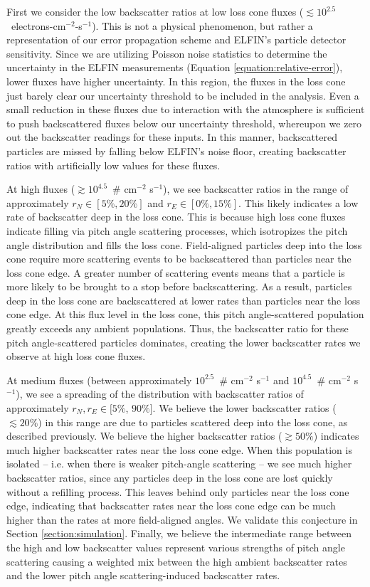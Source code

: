 \documentclass[draft]{agujournal2019}
\begin{document}
First we consider the low backscatter ratios at low loss cone fluxes ($\lesssim 10^{2.5}$~electrons-cm$^{-2}$-s$^{-1}$). This is not a physical phenomenon, but rather a representation of our error propagation scheme and ELFIN's particle detector sensitivity. Since we are utilizing Poisson noise statistics to determine the uncertainty in the ELFIN measurements (Equation \ref{equation:relative-error}), lower fluxes have higher uncertainty. In this region, the fluxes in the loss cone just barely clear our uncertainty threshold to be included in the analysis. Even a small reduction in these fluxes due to interaction with the atmosphere is sufficient to push backscattered fluxes below our uncertainty threshold, whereupon we zero out the backscatter readings for these inputs. In this manner, backscattered particles are missed by falling below ELFIN's noise floor, creating backscatter ratios with artificially low values for these fluxes.

At high fluxes ($\gtrsim 10^{4.5}$~\# cm$^{-2}$ s$^{-1}$), we see backscatter ratios in the range of approximately $r_N \in [5\%, 20\%]$ and $r_E \in [0\%, 15\%]$. This likely indicates a low rate of backscatter deep in the loss cone. This is because high loss cone fluxes indicate filling via pitch angle scattering processes, which isotropizes the pitch angle distribution and fills the loss cone. Field-aligned particles deep into the loss cone require more scattering events to be backscattered than particles near the loss cone edge. A greater number of scattering events means that a particle is more likely to be brought to a stop before backscattering. As a result, particles deep in the loss cone are backscattered at lower rates than particles near the loss cone edge. At this flux level in the loss cone, this pitch angle-scattered population greatly exceeds any ambient populations. Thus, the backscatter ratio for these pitch angle-scattered particles dominates, creating the lower backscatter rates we observe at high loss cone fluxes.

At medium fluxes (between approximately $10^{2.5}$~\# cm$^{-2}$ s$^{-1}$ and $10^{4.5}$~\# cm$^{-2}$ s$^{-1}$), we see a spreading of the distribution with backscatter ratios of approximately $r_N, r_E \in [5\%$, $90\%]$. We believe the lower backscatter ratios ($\lesssim 20\%$) in this range are due to particles scattered deep into the loss cone, as described previously. We believe the higher backscatter ratios ($\gtrsim 50\%$) indicates much higher backscatter rates near the loss cone edge. When this population is isolated -- i.e. when there is weaker pitch-angle scattering -- we see much higher backscatter ratios, since any particles deep in the loss cone are lost quickly without a refilling process. This leaves behind only particles near the loss cone edge, indicating that backscatter rates near the loss cone edge can be much higher than the rates at more field-aligned angles. We validate this conjecture in Section \ref{section:simulation}. Finally, we believe the intermediate range between the high and low backscatter values represent various strengths of pitch angle scattering causing a weighted mix between the high ambient backscatter rates and the lower pitch angle scattering-induced backscatter rates.
\end{document}
